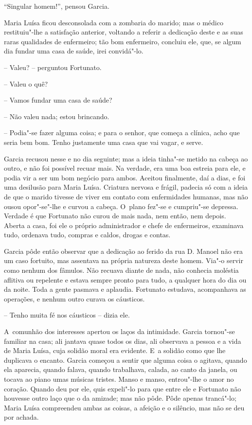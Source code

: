 ``Singular homem!'', pensou Garcia.

Maria Luísa ficou desconsolada com a zombaria do marido; mas o médico
restituiu"-lhe a satisfação anterior, voltando a referir a dedicação
deste e as suas raras qualidades de enfermeiro; tão bom enfermeiro,
concluiu ele, que, se algum dia fundar uma casa de saúde, irei
convidá"-lo.

-- Valeu? -- perguntou Fortunato.

-- Valeu o quê?

-- Vamos fundar uma casa de saúde?

-- Não valeu nada; estou brincando.

-- Podia"-se fazer alguma coisa; e para o senhor, que começa a clínica,
acho que seria bem bom. Tenho justamente uma casa que vai vagar, e
serve.

Garcia recusou nesse e no dia seguinte; mas a ideia tinha"-se metido na
cabeça ao outro, e não foi possível recuar mais. Na verdade, era uma boa
estreia para ele, e podia vir a ser um bom negócio para ambos. Aceitou
finalmente, daí a dias, e foi uma desilusão para Maria Luísa. Criatura
nervosa e frágil, padecia só com a ideia de que o marido tivesse de
viver em contato com enfermidades humanas, mas não ousou opor"-se"-lhe e
curvou a cabeça. O~plano fez"-se e cumpriu"-se depressa. Verdade é que
Fortunato não curou de mais nada, nem então, nem depois. Aberta a casa,
foi ele o próprio administrador e chefe de enfermeiros, examinava tudo,
ordenava tudo, compras e caldos, drogas e contas.

Garcia pôde então observar que a dedicação ao ferido da rua D. Manoel
não era um caso fortuito, mas assentava na própria natureza deste homem.
Via"-o servir como nenhum dos fâmulos. Não recuava diante de nada, não
conhecia moléstia aflitiva ou repelente e estava sempre pronto para
tudo, a qualquer hora do dia ou da noite. Toda a gente pasmava e
aplaudia. Fortunato estudava, acompanhava as operações, e nenhum outro
curava os cáusticos.

-- Tenho muita fé nos cáusticos -- dizia ele.

A~comunhão dos interesses apertou os laços da intimidade. Garcia
tornou"-se familiar na casa; ali jantava quase todos os dias, ali
observava a pessoa e a vida de Maria Luísa, cuja solidão moral era
evidente. E~a solidão como que lhe duplicava o encanto. Garcia começou a
sentir que alguma coisa o agitava, quando ela aparecia, quando falava,
quando trabalhava, calada, ao canto da janela, ou tocava ao piano umas
músicas tristes. Manso e manso, entrou"-lhe o amor no coração. Quando deu
por ele, quis expeli"-lo para que entre ele e Fortunato não houvesse
outro laço que o da amizade; mas não pôde. Pôde apenas trancá"-lo; Maria
Luísa compreendeu ambas as coisas, a afeição e o silêncio, mas não se
deu por achada.

